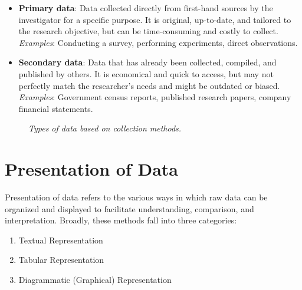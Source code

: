 \documentclass[twoside]{book}
\begin{document}
\begin{itemize}
    \item \textbf{Primary data}: Data collected directly from first-hand sources by the investigator for a specific purpose. It is original, up-to-date, and tailored to the research objective, but can be time-consuming and costly to collect.\\
    \textit{Examples}: Conducting a survey, performing experiments, direct observations.

    \item \textbf{Secondary data}: Data that has already been collected, compiled, and published by others. It is economical and quick to access, but may not perfectly match the researcher’s needs and might be outdated or biased.\\
    \textit{Examples}: Government census reports, published research papers, company financial statements.
\end{itemize}
\begin{figure}[H]
\begin{center}
\end{center}
\caption{\textit{Types of data based on collection methods.}}
\end{figure}

\section{Presentation of Data}

Presentation of data refers to the various ways in which raw data can be organized and displayed to facilitate understanding, comparison, and interpretation. Broadly, these methods fall into three categories:
\begin{enumerate}
  \item Textual Representation
  \item Tabular Representation
  \item Diagrammatic (Graphical) Representation
\end{enumerate}
\end{document}
